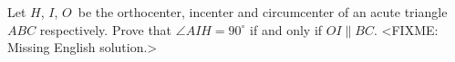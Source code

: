 \problem
Let $H$, $I$, $O$~be the orthocenter, incenter and circumcenter of an acute
triangle $ABC$ respectively.
Prove that $\angle AIH = 90^\circ$ if and only if $OI \parallel BC$.
\solution
<FIXME: Missing English solution.>
\endproblem
